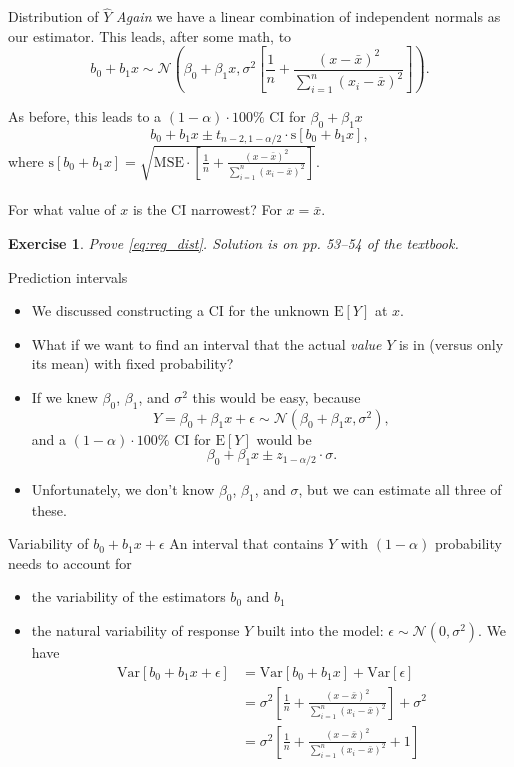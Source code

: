 \documentclass{beamer}
\newcommand{\E}{\mathrm{E}}
\newcommand{\Var}{\mathrm{Var}}
\newcommand{\s}{\mathrm{s}}
\newtheorem{exe}{Exercise}
\begin{document}
\begin{frame}{Distribution of $\hat{Y}$}
\textit{Again} we have a linear combination of independent normals as our estimator. This leads, after some math, to
\begin{equation}
b_0+b_1 x\sim \mathcal{N}\left(\beta_0+\beta_1 x,\sigma^2\left[\frac1n+\frac{(x-\bar{x})^2}{\sum_{i=1}^n(x_i-\bar{x})^2}\right]\right).\label{eq:reg_dist}
\end{equation}

\pause As before, this leads to a $(1-\alpha)\cdot100\%$ CI for $\beta_0+\beta_1 x$
$$
b_0+b_1 x\pm t_{n-2,1-\alpha/2}\cdot\s[b_0+b_1 x],
$$
\pause where $\s[b_0+b_1 x]=\sqrt{\text{MSE}\cdot\left[\frac1n+\frac{(x-\bar{x})^2}{\sum_{i=1}^n(x_i-\bar{x})^2}\right]}.$\\~\\

\pause For what value of $x$ is the CI narrowest? \pause For $x=\bar{x}$.

\begin{exe}
Prove \eqref{eq:reg_dist}. \pause Solution is on pp. 53--54 of the textbook.
\end{exe}
\end{frame}

\begin{frame}{Prediction intervals}
\begin{itemize}
\item We discussed constructing a CI for the unknown $\E[Y]$ at $x$.
\item<2-> What if we want to find an interval that the actual \textit{value} $Y$ is in (versus only its mean) with fixed probability?
\item<3-> If we knew $\beta_0$, $\beta_1$, and $\sigma^2$ this would be easy, because
$$
Y=\beta_0+\beta_1 x+\epsilon\sim\mathcal{N}(\beta_0+\beta_1 x,\sigma^2),
$$
and a $(1-\alpha)\cdot100\%$ CI for $\E[Y]$ would be
$$
\beta_0+\beta_1 x\pm z_{1-\alpha/2}\cdot\sigma.
$$
\item<4-> Unfortunately, we don't know $\beta_0$, $\beta_1$, and $\sigma$, but we can estimate all three of these.
\end{itemize}
\end{frame}

\begin{frame}{Variability of $b_0+b_1 x + \epsilon$}
An interval that contains $Y$ with $(1-\alpha)$ probability needs to account for
\begin{itemize}
\pause\item the variability of the estimators $b_0$ and $b_1$
\pause\item the natural variability of response $Y$ built into the model: $\epsilon\sim\mathcal{N}(0,\sigma^2)$.
\pause We have
\begin{align*}
\Var[b_0+b_1 x + \epsilon]&=\Var[b_0+b_1 x]+\Var[\epsilon]\\
 &=\sigma^2\left[\frac1n+\frac{(x-\bar{x})^2}{\sum_{i=1}^n(x_i-\bar{x})^2}\right]+\sigma^2\\
 &=\sigma^2\left[\frac1n+\frac{(x-\bar{x})^2}{\sum_{i=1}^n(x_i-\bar{x})^2}+1\right]
\end{align*}
\end{itemize}
\end{frame}
\end{document}
